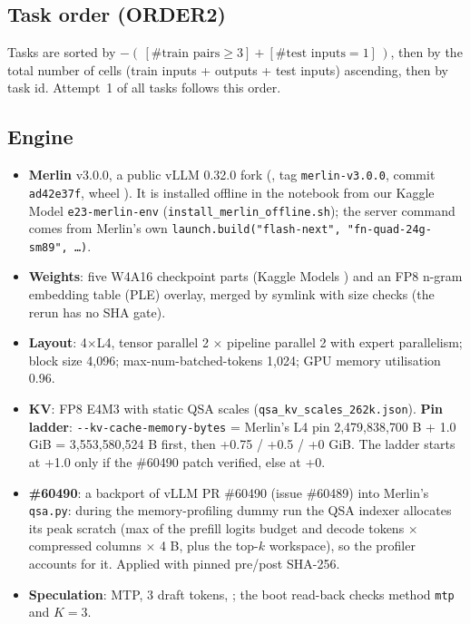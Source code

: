 \subsection{Task order (ORDER2)}
Tasks are sorted by $-(\,[\#\text{train pairs}\ge 3] + [\#\text{test inputs} = 1]\,)$, then by the total number of cells (train inputs + outputs + test inputs) ascending, then by task id. Attempt~1 of all tasks follows this order.

\subsection{Engine}
\begin{itemize}[leftmargin=*,itemsep=1pt]
\item \textbf{Merlin} v3.0.0, a public vLLM 0.32.0 fork (, tag \texttt{merlin-v3.0.0}, commit \texttt{ad42e37f}, wheel ). It is installed offline in the notebook from our Kaggle Model \texttt{e23-merlin-env} (\texttt{install\_merlin\_offline.sh}); the server command comes from Merlin's own \texttt{launch.build("flash-next", "fn-quad-24g-sm89", \dots)}.
\item \textbf{Weights}: five W4A16 checkpoint parts (Kaggle Models ) and an FP8 n-gram embedding table (PLE) overlay, merged by symlink with size checks (the rerun has no SHA gate).
\item \textbf{Layout}: 4$\times$L4, tensor parallel 2 $\times$ pipeline parallel 2 with expert parallelism; block size 4{,}096; max-num-batched-tokens 1{,}024; GPU memory utilisation 0.96.
\item \textbf{KV}: FP8 E4M3 with static QSA scales (\texttt{qsa\_kv\_scales\_262k.json}). \textbf{Pin ladder}: \texttt{-{}-kv-cache-memory-bytes} = Merlin's L4 pin 2{,}479{,}838{,}700 B + 1.0 GiB = 3{,}553{,}580{,}524 B first, then +0.75 / +0.5 / +0 GiB. The ladder starts at +1.0 only if the \#60490 patch verified, else at +0.
\item \textbf{\#60490}: a backport of vLLM PR \#60490 (issue \#60489) into Merlin's \texttt{qsa.py}: during the memory-profiling dummy run the QSA indexer allocates its peak scratch (max of the prefill logits budget and decode tokens $\times$ compressed columns $\times$ 4 B, plus the top-$k$ workspace), so the profiler accounts for it. Applied with pinned pre/post SHA-256.
\item \textbf{Speculation}: MTP, 3 draft tokens, ; the boot read-back checks method \texttt{mtp} and $K=3$.

\end{itemize}
